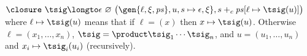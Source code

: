 \blist
    \item $\closure\ \tsig \longto \epsilon\ \varnothing\ \bigl(\gen{\ell,\xi,{\it ps}},u,s\mapsto\epsilon,\xi\},s+_c{\it ps}[\ell\mapsto\tsig(u)]\bigr)$ where $\ell\mapsto\tsig(u)$ means that if
        $\ell=(x)$ then $x\mapsto \tsig(u)$.
        Otherwise $\ell=(x_1,\dots,x_n)$, $\tsig=\product\tsig_1\cdots\tsig_n$, and $u=(u_1,\dots,u_n)$ and $x_i\mapsto\tsig_i(u_i)$ (recursively).
\elist

\bye

